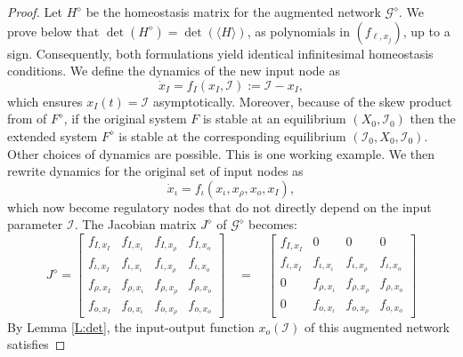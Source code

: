\documentclass[10pt,a4paper]{amsart}
\newcommand{\II}{{\mathcal I}}
\newcommand{\Matrixc}[1]{\ensuremath{\left[\begin{array}{cccccccccccc|ccc} #1 \end{array}\right]}}
\begin{document}
\begin{proof} 
Let $H^\diamond$ be the homeostasis matrix for the augmented network $\mathcal{G}^\diamond$. 
We prove below that $\det(H^\diamond) = \det(\langle H \rangle)$, as polynomials in $(f_{\ell,x_j})$, up to a sign.
Consequently, both formulations yield identical infinitesimal homeostasis conditions.
We define the dynamics of the new input node as 
\[
\dot{x}_{I}=f_I(x_{I},\mathcal{I}) := \mathcal{I}-x_I,
\]
which ensures $x_I(t) = \mathcal{I}$ asymptotically.
Moreover, because of the skew product from of $F^\diamond$, if the original system $F$ is stable at an equilibrium $(X_0,\II_0)$ then the extended system $F^\diamond$ is stable at the corresponding equilibrium $(\II_0,X_0,\II_0)$. 
Other choices of dynamics are possible. 
This is one working example. 
We then rewrite dynamics for the original set of input nodes as 
\[
\dot{x}_{\iota} = f_{\iota}(x_\iota,x_\rho,x_o, x_I),
\]
which now become regulatory nodes that do not directly depend on the input parameter $\mathcal{I}$. 
The Jacobian matrix $J^\diamond$ of $\mathcal{G}^\diamond$ becomes:
\[
J^\diamond = \begin{bmatrix}
f_{I, x_{I}} & f_{I, x_{\iota}} & f_{I, x_{\rho}} & f_{I, x_o} \\
f_{\iota, x_{I}} & f_{\iota, x_{\iota}} & f_{\iota, x_{\rho}} & f_{\iota, x_o} \\
f_{\rho, x_{I}} & f_{\rho, x_{\iota}} & f_{\rho, x_{\rho}} & f_{\rho, x_o} \\
f_{o, x_{I}} & f_{o, x_{\iota}} & f_{o, x_{\rho}} & f_{o, x_o}
\end{bmatrix}
\quad=\quad
\begin{bmatrix}
f_{I, x_{I}} & 0 & 0 & 0 \\
f_{\iota, x_{I}} & f_{\iota, x_{\iota}} & f_{\iota, x_{\rho}} & f_{\iota, x_o} \\
0 & f_{\rho, x_{\iota}} & f_{\rho, x_{\rho}} & f_{\rho, x_o} \\
0 & f_{o, x_{\iota}} & f_{o, x_{\rho}} & f_{o, x_o}
\end{bmatrix}
\]
By Lemma \ref{L:det}, the input-output function $x_o(\mathcal{I})$ of this augmented network satisfies 

\end{proof}
\end{document}
